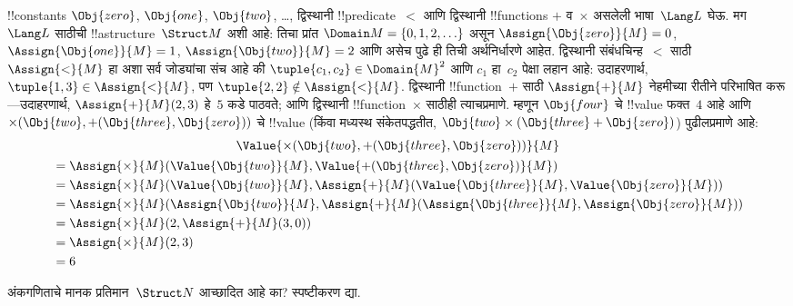 \documentclass[../../../include/open-logic-section]{subfiles}
\begin{document}
\begin{ex}
!!{constant}s $\Obj{zero}$, $\Obj{one}$, $\Obj{two}$, \dots, द्विस्थानी
!!{predicate}~$<$ आणि द्विस्थानी !!{function}s $+$ व~$\times$ असलेली
भाषा~$\Lang L$ घेऊ. मग~$\Lang L$ साठीची !!a{structure}~$\Struct M$ अशी
आहे: तिचा प्रांत $\Domain M = \{0, 1, 2, \ldots \}$ असून
$\Assign{\Obj{zero}}{M} = 0$, $\Assign{\Obj{one}}{M} = 1$,
$\Assign{\Obj{two}}{M} = 2$ आणि असेच पुढे ही तिची अर्थनिर्धारणे आहेत.
द्विस्थानी संबंधचिन्ह~$<$ साठी $\Assign{<}{M}$ हा अशा सर्व जोड्यांचा
संच आहे की $\tuple{c_1, c_2} \in \Domain{M}^2$ आणि $c_1$ हा~$c_2$ पेक्षा
लहान आहे: उदाहरणार्थ, $\tuple{1, 3} \in \Assign{<}{M}$, पण
$\tuple{2, 2} \notin \Assign{<}{M}$. द्विस्थानी !!{function}~$+$ साठी
$\Assign{+}{M}$ नेहमीच्या रीतीने परिभाषित करू---उदाहरणार्थ,
$\Assign{+}{M}(2,3)$ हे~$5$ कडे पाठवते; आणि द्विस्थानी
!!{function}~$\times$ साठीही त्याचप्रमाणे. म्हणून $\Obj{four}$ चे
!!{value} फक्त~$4$ आहे आणि $\times(\Obj{two},
+(\Obj{three},\Obj{zero}))$ चे !!{value} (किंवा मध्यस्थ संकेतपद्धतीत,
$\Obj{two} \times (\Obj{three} + \Obj{zero})$) पुढीलप्रमाणे आहे:
\begin{multline*}
\Value{\times(\Obj{two}, +(\Obj{three},\Obj{zero}))}{M} \\
\begin{aligned}
& =\Assign{\times}{M}(\Value{\Obj{two}}{M}, \Value{+(\Obj{three}, \Obj{zero})}{M})\\
& = \Assign{\times}{M}(\Value{\Obj{two}}{M}, \Assign{+}{M}(\Value{\Obj{three}}{M},
\Value{\Obj{zero}}{M})) \\
& = \Assign{\times}{M}(\Assign{\Obj{two}}{M}, \Assign{+}{M}(\Assign{\Obj{three}}{M},
\Assign{\Obj{zero}}{M})) \\
& = \Assign{\times}{M}(2, \Assign{+}{M}(3, 0)) \\
& = \Assign{\times}{M}(2, 3) \\
& = 6
\end{aligned}
\end{multline*}
\end{ex}

\begin{prob}
अंकगणिताचे मानक प्रतिमान~$\Struct N$ आच्छादित आहे का? स्पष्टीकरण द्या.
\end{prob}
\end{document}
